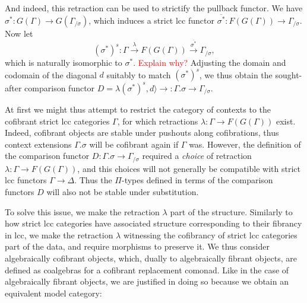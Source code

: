 \documentclass{article}
\newcommand{\todo}[1]{\textcolor{red}{#1}}
\theoremstyle{remark}
\theoremstyle{definition}
\begin{document}
And indeed, this retraction can be used to strictify the pullback functor.
We have $\sigma^* : G(\Gamma) \rightarrow G(\Gamma_{/ \sigma})$, which induces a strict lcc functor $\overline{\sigma^*} : F(G(\Gamma)) \rightarrow \Gamma_{/ \sigma}$.
Now let
\begin{equation}
  (\sigma^*)^s : \Gamma \xrightarrow{\lambda} F(G(\Gamma)) \xrightarrow{\overline{\sigma^*}} \Gamma_{/ \sigma},
\end{equation}
which is naturally isomorphic to $\sigma^*$.
\todo{Explain why?}
Adjusting the domain and codomain of the diagonal $d$ suitably to match $(\sigma^*)^s$, we thus obtain the sought-after comparison functor $D = \lambda (\sigma^*)^s, d \rangle \rightarrow : \Gamma.\sigma \rightarrow \Gamma_{/ \sigma}$.

At first we might thus attempt to restrict the category of contexts to the cofibrant strict lcc categories $\Gamma$, for which retractions $\lambda : \Gamma \rightarrow F(G(\Gamma))$ exist.
Indeed, cofibrant objects are stable under pushouts along cofibrations, thus context extensions $\Gamma.\sigma$ will be cofibrant again if $\Gamma$ was.
However, the definition of the comparison functor $D : \Gamma.\sigma \rightarrow \Gamma_{/ \sigma}$ required a \emph{choice} of retraction $\lambda : \Gamma \rightarrow F(G(\Gamma))$, and this choices will not generally be compatible with strict lcc functors $\Gamma \rightarrow \Delta$.
Thus the $\Pi$-types defined in terms of the comparison functors $D$ will also not be stable under substitution.

To solve this issue, we make the retraction $\lambda$ part of the structure.
Similarly to how strict lcc categories have associated structure corresponding to their fibrancy in lcc, we make the retraction $\lambda$ witnessing the cofibrancy of strict lcc categories part of the data, and require morphisms to preserve it.
We thus consider algebraically cofibrant objects, which, dually to algebraically fibrant objects, are defined as coalgebras for a cofibrant replacement comonad.
Like in the case of algebraically fibrant objects, we are justified in doing so because we obtain an equivalent model category:
\end{document}
